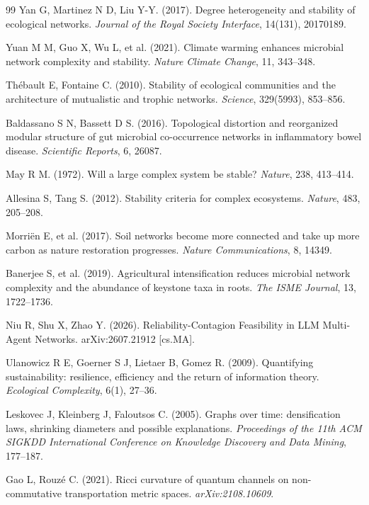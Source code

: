 \documentclass[11pt,a4paper]{article}
\begin{document}
\begin{thebibliography}{99}
Yan G, Martinez N D, Liu Y-Y. (2017).
Degree heterogeneity and stability of ecological networks.
\textit{Journal of the Royal Society Interface}, 14(131), 20170189.

Yuan M M, Guo X, Wu L, et al. (2021).
Climate warming enhances microbial network complexity and stability.
\textit{Nature Climate Change}, 11, 343--348.

Th\'{e}bault E, Fontaine C. (2010).
Stability of ecological communities and the architecture of mutualistic and
trophic networks. \textit{Science}, 329(5993), 853--856.

Baldassano S N, Bassett D S. (2016).
Topological distortion and reorganized modular structure of gut microbial
co-occurrence networks in inflammatory bowel disease.
\textit{Scientific Reports}, 6, 26087.

May R M. (1972).
Will a large complex system be stable? \textit{Nature}, 238, 413--414.

Allesina S, Tang S. (2012).
Stability criteria for complex ecosystems. \textit{Nature}, 483, 205--208.

Morri\"{e}n E, et al. (2017).
Soil networks become more connected and take up more carbon as nature
restoration progresses. \textit{Nature Communications}, 8, 14349.

Banerjee S, et al. (2019).
Agricultural intensification reduces microbial network complexity and the
abundance of keystone taxa in roots. \textit{The ISME Journal}, 13, 1722--1736.

Niu R, Shu X, Zhao Y. (2026).
Reliability-Contagion Feasibility in LLM Multi-Agent Networks.
arXiv:2607.21912 [cs.MA].

Ulanowicz R E, Goerner S J, Lietaer B, Gomez R. (2009).
Quantifying sustainability: resilience, efficiency and the return of
information theory. \textit{Ecological Complexity}, 6(1), 27--36.

Leskovec J, Kleinberg J, Faloutsos C. (2005).
Graphs over time: densification laws, shrinking diameters and possible
explanations. \textit{Proceedings of the 11th ACM SIGKDD International
Conference on Knowledge Discovery and Data Mining}, 177--187.

Gao L, Rouz\'{e} C. (2021).
Ricci curvature of quantum channels on non-commutative transportation
metric spaces. \textit{arXiv:2108.10609}.

\end{thebibliography}
\end{document}
